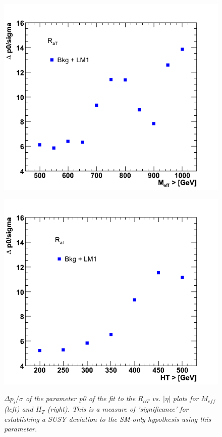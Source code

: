 \begin{figure}[h!]
\begin{minipage}[b]{0.5\linewidth}
\centering
{\label{fig:meff_p0_s}\includegraphics[scale=0.4]{./plots/Meff-NT7-p0-Sig}} 
\end{minipage}
\begin{minipage}[b]{0.5\linewidth}
\centering
{\label{fig:HT_p0_s}\includegraphics[scale=0.4]{./plots/HT-NT7-p0-Sig}} 
\end{minipage}
\caption{\small{\textit{ $\Delta p_{i} / \sigma$ of the parameter p0 of the fit to the $R_{\alpha T}$ vs. $|\eta|$ plots for $M_{eff}$ (left) and $H_{T}$ (right). This is a measure of 'significance' for establishing a SUSY deviation to the SM-only hypothesis using this parameter.}}}
\label{fig:meff5}
\end{figure}



